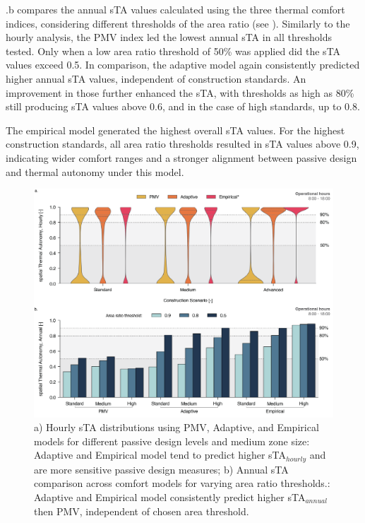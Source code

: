 .b compares the annual sTA values calculated using the three thermal comfort indices, considering different thresholds of the area ratio (see ). Similarly to the hourly analysis, the PMV index led the lowest annual sTA in all thresholds tested. Only when a low area ratio threshold of 50\% was applied did the sTA values exceed 0.5. In comparison, the adaptive model again consistently predicted higher annual sTA values, independent of construction standards. An improvement in those further enhanced the sTA, with thresholds as high as 80\% still producing sTA values above 0.6, and in the case of high standards, up to 0.8.

The empirical model generated the highest overall sTA values. For the highest construction standards, all area ratio thresholds resulted in sTA values above 0.9, indicating wider comfort ranges and a stronger alignment between passive design and thermal autonomy under this model.

\begin{figure}[h!]
    \centering
    \includegraphics[width=\textwidth]{manuscript/src/figures/model-comparison.png}
    \caption{a) Hourly sTA distributions using PMV, Adaptive, and Empirical models for different passive design levels and medium zone size: Adaptive and Empirical model tend to predict higher sTA$_{hourly}$ and are more sensitive passive design measures; b) Annual sTA comparison across comfort models for varying area ratio thresholds.: Adaptive and Empirical model consistently predict higher sTA$_{annual}$ then PMV, independent of chosen area threshold.}
    \label{fig:model-comparison}
\end{figure}


